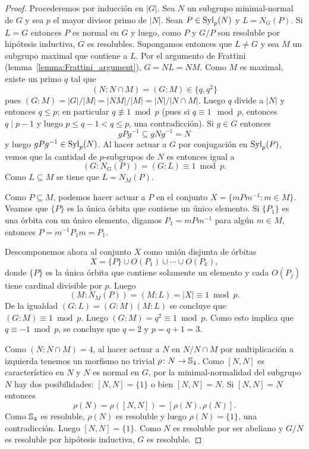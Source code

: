 \begin{proof}
	Procederemos por inducción en $|G|$. Sea $N$ un subgrupo minimal-normal de
	$G$ y sea $p$ el mayor divisor primo de $|N|$. Sean $P\in\mathrm{Syl}_p(N)$ y
	$L=N_G(P)$. Si $L=G$ entonces $P$ es normal en $G$ y luego, como $P$ y
	$G/P$ son resoluble por hipótesis inductiva, $G$ es resolubles. Supongamos
	entonces que $L\ne G$ y sea $M$ un subgrupo maximal que contiene a $L$. 
	Por el argumento de Frattini (lemma~\ref{lemma:Frattini_argument}),  
	$G=NL=NM$. Como $M$ es maximal, 
	existe un primo $q$ tal que 
	\[
	(N:N\cap M)=(G:M)\in\{q,q^2\}
	\]
	pues $(G:M)=|G|/|M|=|NM|/|M|=|N|/|N\cap M|$.  
	Luego $q$ divide a $|N|$ y entonces $q\leq p$; en particular $q\not\equiv
	1\bmod p$ (pues si $q\equiv1\mod p$, entonces $q\mid p-1$ y luego $p\leq q-1<q\leq p$, una contradicción). 
	Si $g\in G$ entonces 
	\[
	gPg^{-1}\subseteq gNg^{-1}=N
	\]
	y luego $gPg^{-1}\in\mathrm{Syl}_p(N)$. Al hacer actuar a $G$ por conjugación en
	$\mathrm{Syl}_p(P)$, vemos que la cantidad de $p$-subgrupos de $N$ es entonces
	igual a 
	\[
		(G:N_G(P))=(G:L)\equiv 1\bmod p.	
	\]
	Como $L\subseteq M$ se tiene que $L=N_M(P)$. 
	
	Como $P\subseteq M$, podemos hacer actuar
	a $P$ en el conjunto $X=\{mPm^{-1}:m\in M\}$. Veamos que $\{P\}$ es la
	única órbita que contiene un único elemento. Si $\{P_1\}$ es una órbita con
	un único elemento, digamos $P_1=mPm^{-1}$ para algún $m\in M$, entonces
 	$P=m^{-1}P_1m=P_1$. 

    Descomponemos ahora al conjunto $X$ como unión
	disjunta de órbitas
	\[
	X=\{P\}\cup O(P_1)\cup\cdots\cup O(P_k),
	\]
	donde $\{P\}$ es la única órbita que contiene solamente un elemento y cada
	$O(P_j)$ tiene cardinal divisible por $p$. 
	Luego 
	\[
		(M:N_M(P))=(M:L)=|X|\equiv1\bmod p.
	\]
	De la igualdad $(G:L)=(G:M)(M:L)$ se concluye que $(G:M)\equiv1\bmod p$.
	Luego $(G:M)=q^2\equiv 1\bmod p$. Como esto implica que $q\equiv -1\bmod
	p$, se concluye que $q=2$ y $p=q+1=3$.

	Como $(N:N\cap M)=4$, al hacer actuar a $N$ en $N/N\cap M$ por
	multiplicación a izquierda tenemos un morfismo no trivial $\rho\colon
	N\to\mathbb{S}_4$. Como $[N,N]$ es característico en $N$ y $N$ es normal en $G$,
	por la minimal-normalidad del subgrupo $N$ hay dos posibilidades: $[N,N]=\{1\}$ o bien 
	$[N,N]=N$. Si $[N,N]=N$ entonces
	\[
	\rho(N)=\rho([N,N])=[\rho(N),\rho(N)].
	\]
	Como $\mathbb{S}_4$ es resoluble, $\rho(N)$ es resoluble y luego $\rho(N)=\{1\}$, una
	contradicción. Luego $[N,N]=\{1\}$. Como $N$ es resoluble por ser abeliano
	y $G/N$ es resoluble por hipótesis inductiva, $G$ es resoluble.
\end{proof}

